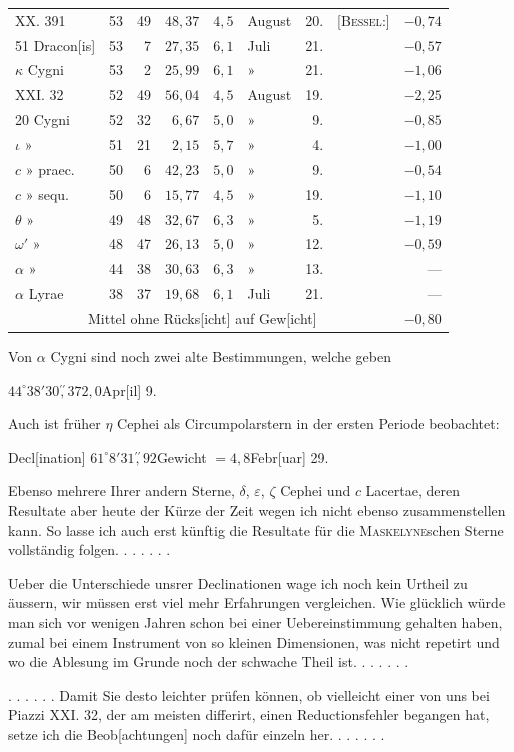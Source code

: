 \begin{center}\begingroup\fontsize{9.5}{12}\selectfont\setlength{\tabcolsep}{2pt}
\begin{tabular}{@{}lrrrclrlr@{}}
XX. 391&53&49&\(48{,}37\)&\(4{,}5\)&August&20.&[\textsc{Bessel}:]&\(-0{,}74\)\\
51 Dracon[is]&53&7&\(27{,}35\)&\(6{,}1\)&Juli&21.&&\(-0{,}57\)\\
\(\kappa\) Cygni&53&2&\(25{,}99\)&\(6{,}1\)&»&21.&&\(-1{,}06\)\\
XXI. 32&52&49&\(56{,}04\)&\(4{,}5\)&August&19.&&\(-2{,}25\)\\
20 Cygni&52&32&\(6{,}67\)&\(5{,}0\)&»&9.&&\(-0{,}85\)\\
\(\iota\) »&51&21&\(2{,}15\)&\(5{,}7\)&»&4.&&\(-1{,}00\)\\
\(c\) » praec.&50&6&\(42{,}23\)&\(5{,}0\)&»&9.&&\(-0{,}54\)\\
\(c\) » sequ.&50&6&\(15{,}77\)&\(4{,}5\)&»&19.&&\(-1{,}10\)\\
\(\theta\) »&49&48&\(32{,}67\)&\(6{,}3\)&»&5.&&\(-1{,}19\)\\
\(\omega'\) »&48&47&\(26{,}13\)&\(5{,}0\)&»&12.&&\(-0{,}59\)\\
\(\alpha\) »&44&38&\(30{,}63\)&\(6{,}3\)&»&13.&&—\\
\(\alpha\) Lyrae&38&37&\(19{,}68\)&\(6{,}1\)&Juli&21.&&—\\\hline
\multicolumn{8}{c}{Mittel ohne Rücks[icht] auf Gew[icht]}&\(-0{,}80\)
\end{tabular}\par\endgroup\end{center}

\noindent\hspace*{\parindent}Von \(\alpha\) Cygni sind noch zwei alte Bestimmungen, welche geben
\begin{center}\(44^\circ38'30\overset{\prime\prime}{,}37\)\quad [Gewicht] \(2{,}0\)\quad Apr[il] 9.\end{center}
\noindent Auch ist früher \(\eta\) Cephei als Circumpolarstern in der ersten Periode beobachtet:
\begin{center}Decl[ination] \(61^\circ8'31\overset{\prime\prime}{,}92\)\quad Gewicht \(=4{,}8\)\quad Febr[uar] 29.\end{center}
\noindent Ebenso mehrere Ihrer andern Sterne, \(\delta\), \(\varepsilon\), \(\zeta\) Cephei und \(c\) Lacertae, deren Resultate aber heute der Kürze der Zeit wegen ich nicht ebenso zusammenstellen kann. So lasse ich auch erst künftig die Resultate für die \textsc{Maskelyne}schen Sterne vollständig folgen. . . . . . .

Ueber die Unterschiede unsrer Declinationen wage ich noch kein Urtheil zu äussern, wir müssen erst viel mehr Erfahrungen vergleichen. Wie glücklich würde man sich vor wenigen Jahren schon bei einer  Uebereinstimmung gehalten haben, zumal bei einem Instrument von so kleinen Dimensionen, was nicht repetirt und wo die Ablesung im Grunde noch der schwache Theil ist. . . . . . .

. . . . . . Damit Sie desto leichter prüfen können, ob vielleicht einer von uns bei Piazzi XXI. 32, der am meisten differirt, einen Reductionsfehler begangen hat, setze ich die Beob[achtungen] noch dafür einzeln her. . . . . . .
\clearpage\endgroup
